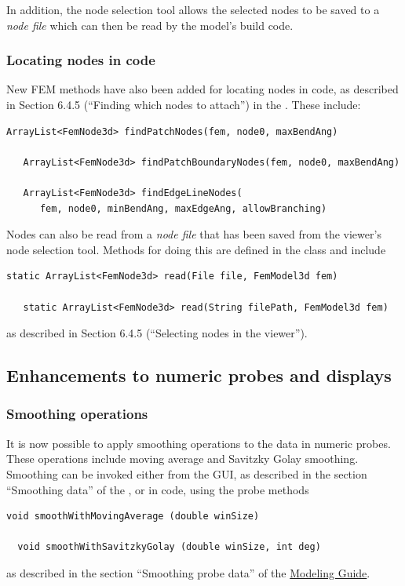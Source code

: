 \documentclass{article}
\begin{document}
In addition, the node selection tool allows the selected nodes to be
saved to a {\it node file} which can then be read by the model's build
code.

\subsubsection{Locating nodes in code}

New FEM methods have also been added for locating nodes in code, as
described in Section 6.4.5 (``Finding which nodes to attach'') in the
. These 
include:
%
\begin{lstlisting}[]
   ArrayList<FemNode3d> findPatchNodes(fem, node0, maxBendAng) 

   ArrayList<FemNode3d> findPatchBoundaryNodes(fem, node0, maxBendAng)

   ArrayList<FemNode3d> findEdgeLineNodes(
      fem, node0, minBendAng, maxEdgeAng, allowBranching)
\end{lstlisting}
%

Nodes can also be read from a {\it node file} that has been saved from
the viewer's node selection tool.  Methods for doing this are defined
in the  class
and include
\begin{lstlisting}[]
   static ArrayList<FemNode3d> read(File file, FemModel3d fem)

   static ArrayList<FemNode3d> read(String filePath, FemModel3d fem)
\end{lstlisting}
%
as described in Section 6.4.5 (``Selecting nodes in the viewer'').

\subsection*{Enhancements to numeric probes and displays}

\subsubsection{Smoothing operations}

It is now possible to apply smoothing operations to the data in
numeric probes. These operations include moving average and Savitzky
Golay smoothing. Smoothing can be invoked either from the GUI, as
described in the section ``Smoothing data'' of the
, or in code, using the
probe methods
%
\begin{lstlisting}[]
  void smoothWithMovingAverage (double winSize)
  
  void smoothWithSavitzkyGolay (double winSize, int deg)
\end{lstlisting}
%
as described in the section ``Smoothing probe data'' of the 
\href{http://www.artisynth.org/doc/pdf/modelguide.pdf}
{Modeling Guide}.
\end{document}
